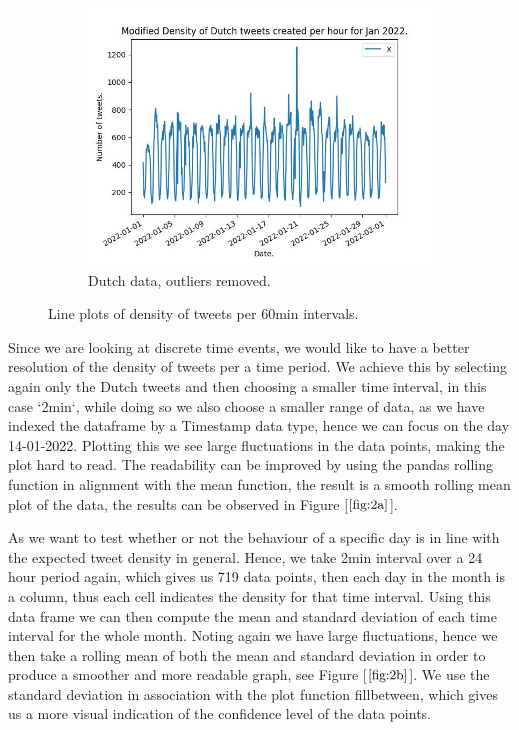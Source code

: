 \documentclass[9pt]{article}
\begin{document}
\begin{figure}[h!]
\begin{subfigure}[b]{0.3\textwidth}
        \includegraphics[scale=0.3]{figures/JanNLmod.jpeg}
        \caption{Dutch data, outliers removed.}
        \label{fig:1c}
    \end{subfigure}
    \caption{Line plots of density of tweets per 60min intervals.}
    \label{fig:g1}
\end{figure}

Since we are looking at discrete time events, we would like to have a better resolution of
the density of tweets per a time period. We achieve this by selecting again only the
Dutch tweets and then choosing a smaller time interval, in this case `2min`, while doing so
we also choose a smaller range of data, as we have indexed the dataframe by a Timestamp data
type, hence we can focus on the day 14-01-2022. Plotting this we see large fluctuations in the
data points, making the plot hard to read. The readability can be improved by using the
pandas rolling function in alignment with the mean function, the result is a smooth rolling
mean plot of the data, the results can be observed in Figure [$\ref{fig:2a}$].

As we want to test whether or not the behaviour of a specific day is in line with the
expected tweet density in general. Hence, we take 2min interval over a 24 hour period
again, which gives us 719 data points, then each day in the month is a column, thus each
cell indicates the density for that time interval. Using this data frame we can then
compute the mean and standard deviation of each time interval for the whole month. Noting
again we have large fluctuations, hence we then take a rolling mean of both the mean and
standard deviation in order to produce a smoother and more readable graph, see Figure
[$\ref{fig:2b}$]. We use the standard deviation in association with the plot function
fillbetween, which gives us a more visual indication of the confidence level of the data
points.
\end{document}
